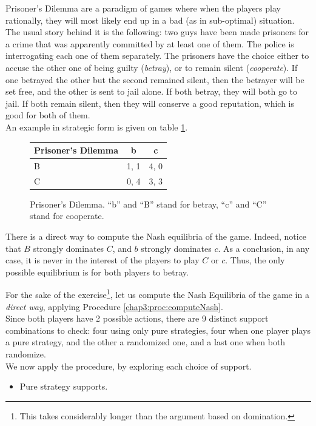 \begin{example}
Prisoner's Dilemma are a paradigm of games where when the players play rationally, they will most likely end up in a bad (as in sub-optimal) situation.\\
The usual story behind it is the following: two guys have been made prisoners for a crime that was apparently committed by at least one of them.
The police is interrogating each one of them separately.
The prisoners have the choice either to accuse the other one of being guilty (\emph{betray}), or to remain silent (\emph{cooperate}).
If one betrayed the other but the second remained silent, then the betrayer will be set free, and the other is sent to jail alone. If both betray, they will both go to jail.
If both remain silent, then they  will conserve a good reputation, which is good for both of them.\\
An example in strategic form is given on table \ref{chap3:pdgame1}.
\begin{figure}[!ht]
\centering
\begin{tabular}{l|cc}
Prisoner's Dilemma & b & c  \\
\hline
B & 1, 1 & 4, 0 \\
C & 0, 4 & 3, 3 \\
\end{tabular}
\caption{Prisoner's Dilemma. ``b'' and ``B'' stand for betray, ``c'' and ``C'' stand for cooperate. }
\label{chap3:pdgame1}
\end{figure}

There is a direct way to compute the Nash equilibria of the game. Indeed, notice that $B$ strongly dominates $C$, and $b$ strongly dominates $c$. As a conclusion, in any case, it is never in the interest of the players to play $C$ or $c$. Thus, the only possible equilibrium is for both players to betray.


For the sake of the exercise\footnote{This takes considerably longer than the argument based on domination.}, let us compute the Nash Equilibria of the game in a \emph{direct way}, applying Procedure \ref{chap3:proc:computeNash}.\\
Since both players have 2 possible actions, there are 9 distinct support combinations to check:  four using only pure strategies, four when one player plays a pure strategy, and the other a randomized one, and a last one when both randomize.\\
We now apply the procedure, by exploring each choice of support.
\begin{itemize}
\item Pure strategy supports.


\end{itemize}
\end{example}
